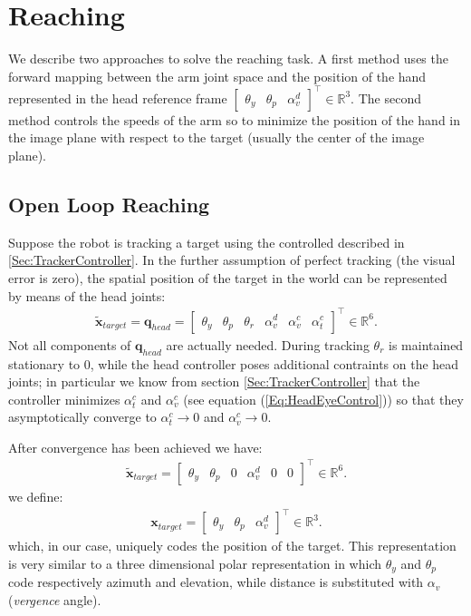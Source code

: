 \section{Reaching}
\label{sec:reaching}

We describe two approaches to solve the reaching task. A first method 
uses the forward mapping between the arm joint space and the position 
of the hand represented in the head reference frame $\begin{bmatrix} 
\theta_y & \theta_p & \alpha_v^d\end{bmatrix}^\top \in \mathbb R^3$. 
The second method controls the speeds of the arm so to minimize the position 
of the hand in the image plane with respect to the target (usually the 
center of the image plane).

\subsection{Open Loop Reaching}
Suppose the robot is tracking a target using the controlled described in 
\ref{Sec:TrackerController}. In the further assumption of perfect tracking 
(the visual error is zero), the spatial position of the target
in the world can be represented by means of the head joints:
%
\begin{eqnarray*}
\tilde {\mathbf x}_{target}= \mathbf q_{head} =
\begin{bmatrix} \theta_y & \theta_p & \theta_r & \alpha_v^d & \alpha_v^c & \alpha_t^c \end{bmatrix}^\top \in \mathbb R^6.
\end{eqnarray*}
%
Not all components of $\mathbf q_{head}$ are actually needed. During tracking 
$\theta_r$ is maintained stationary to 0, while the head controller 
poses additional contraints on the head joints; in particular we know from section 
\ref{Sec:TrackerController} that the controller minimizes $\alpha_t^c$ and
$\alpha^c_v$ (see equation (\ref{Eq:HeadEyeControl})) so that they asymptotically
converge to $\alpha_t^c \rightarrow 0$ and $\alpha_v^c \rightarrow 0$. 

After convergence has been achieved we have:
%
\begin{eqnarray*}
\tilde {\mathbf x}_{target}=
\begin{bmatrix} \theta_y & \theta_p & 0 & \alpha_v^d & 0 & 0 \end{bmatrix}^\top \in \mathbb R^6.
\end{eqnarray*}
%
we define:
%
\begin{eqnarray*}
\mathbf x_{target}=
\begin{bmatrix} \theta_y & \theta_p & \alpha_v^d\end{bmatrix}^\top \in \mathbb R^3.
\end{eqnarray*}
%
which, in our case, uniquely codes the position of the target. This representation is very similar 
to a three dimensional polar representation in which $\theta_y$ and $\theta_p$ code respectively 
azimuth and elevation, while distance is substituted with $\alpha_v$ (\emph{vergence} angle). 

